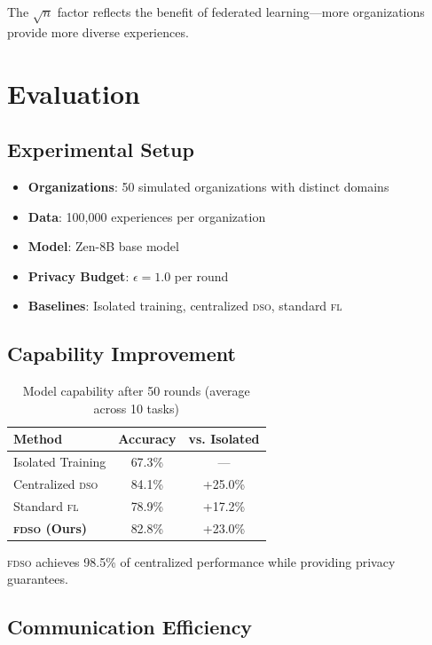 \documentclass[11pt,letterpaper]{article}
\newcommand{\DSO}{\textsc{dso}}
\newcommand{\FDSO}{\textsc{fdso}}
\newcommand{\FL}{\textsc{fl}}
\begin{document}
The $\sqrt{n}$ factor reflects the benefit of federated learning---more organizations provide more diverse experiences.

\section{Evaluation}
\label{sec:evaluation}

\subsection{Experimental Setup}

\begin{itemize}
    \item \textbf{Organizations}: 50 simulated organizations with distinct domains
    \item \textbf{Data}: 100,000 experiences per organization
    \item \textbf{Model}: Zen-8B base model
    \item \textbf{Privacy Budget}: $\epsilon = 1.0$ per round
    \item \textbf{Baselines}: Isolated training, centralized \DSO{}, standard \FL{}
\end{itemize}

\subsection{Capability Improvement}

\begin{table}[h]
\centering
\caption{Model capability after 50 rounds (average across 10 tasks)}
\label{tab:capability}
\begin{tabular}{lcc}
\toprule
\textbf{Method} & \textbf{Accuracy} & \textbf{vs. Isolated} \\
\midrule
Isolated Training & 67.3\% & --- \\
Centralized \DSO{} & 84.1\% & +25.0\% \\
Standard \FL{} & 78.9\% & +17.2\% \\
\textbf{\FDSO{} (Ours)} & 82.8\% & +23.0\% \\
\bottomrule
\end{tabular}
\end{table}

\FDSO{} achieves 98.5\% of centralized performance while providing privacy guarantees.

\subsection{Communication Efficiency}
\end{document}
